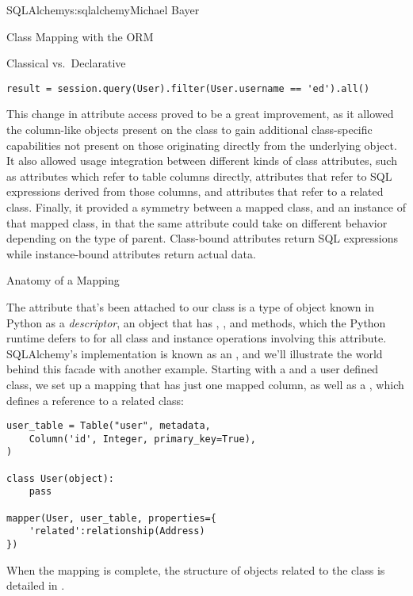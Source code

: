\begin{aosachapter}{SQLAlchemy}{s:sqlalchemy}{Michael Bayer}
\begin{aosasect1}{Class Mapping with the ORM}
\begin{aosasect2}{Classical vs.\ Declarative}
\begin{verbatim}
result = session.query(User).filter(User.username == 'ed').all()
\end{verbatim}

This change in attribute access proved to be a great improvement, as it
allowed the column-like objects
present on the class to gain additional class-specific capabilities not
present on those originating directly from the underlying  object. It
also allowed usage integration between different kinds of class attributes,
such as attributes which refer to table columns directly, attributes that
refer to SQL expressions derived from those columns, and attributes that
refer to a related class.  Finally, it provided a symmetry between a mapped
class, and an instance of that mapped class, in that the same attribute
could take on different behavior depending on the type of parent.  Class-bound
attributes return SQL expressions while instance-bound attributes return
actual data.

\end{aosasect2}

\begin{aosasect2}{Anatomy of a Mapping}

The  attribute that's been attached to our  class is a type of
object known in Python as a \emph{descriptor}, an object
that has , , and  methods, which the Python
runtime defers to for all class and instance operations involving this attribute.
SQLAlchemy's implementation is known as an ,
and we'll illustrate the world behind this facade with another example.
Starting with a  and a user defined class, we set up a mapping that has just one
mapped column, as well as a , which defines a reference to a related class:

\begin{verbatim}
user_table = Table("user", metadata,
    Column('id', Integer, primary_key=True),
)

class User(object):
    pass

mapper(User, user_table, properties={
    'related':relationship(Address)
})
\end{verbatim}

When the mapping is complete, the structure of objects related to the class is detailed in .



\end{aosasect2}
\end{aosasect1}
\end{aosachapter}
